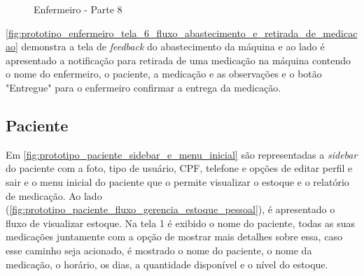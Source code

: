\begin{figure}[H]
    \centering
    \caption{Enfermeiro - Parte 8}
\end{figure}

\ref{fig:prototipo_enfermeiro_tela_6_fluxo_abastecimento_e_retirada_de_medicacao} demonstra a tela de \textit{feedback} do abastecimento da máquina e ao lado é apresentado a notificação para retirada de uma medicação na máquina contendo o nome do enfermeiro, o paciente, a medicação e as observações e o botão "Entregue" para o enfermeiro confirmar a entrega da medicação. 

\subsection{Paciente}
Em \ref{fig:prototipo_paciente_sidebar_e_menu_inicial} são representadas a \textit{sidebar} do paciente com a foto, tipo de usuário, CPF, telefone e opções de editar perfil e sair e o menu inicial do paciente que o permite visualizar o estoque e o relatório de medicação. Ao lado (\ref{fig:prototipo_paciente_fluxo_gerencia_estoque_pessoal}), é apresentado o fluxo de visualizar estoque. Na tela 1 é exibido o nome do paciente, todas as suas medicações juntamente com a opção de mostrar mais detalhes sobre essa, caso esse caminho seja acionado, é mostrado o nome do paciente, o nome da medicação, o horário, os dias, a quantidade disponível e o nível do estoque.

